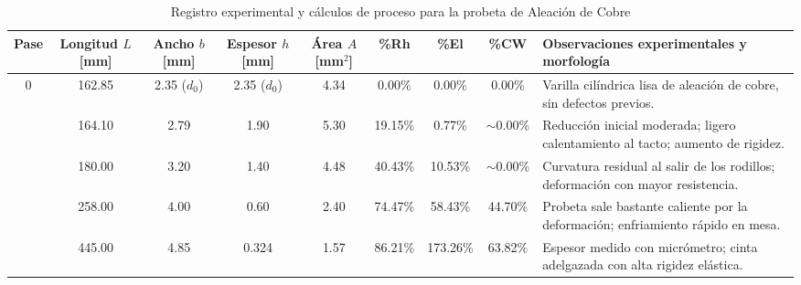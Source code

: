 \documentclass[journal]{IEEEtran}
\begin{document}
\begin{table}[t]
\centering
\caption{Registro experimental y cálculos de proceso para la probeta de Aleación de Cobre}
\label{tab:datos_cobre}
\footnotesize
\setlength{\tabcolsep}{3.5pt}
\renewcommand{\arraystretch}{1.15}
\begin{tabularx}{\textwidth}{c c c c c c c c >{\raggedright\arraybackslash}X}
\toprule
\textbf{Pase} & \makecell{\textbf{Longitud}\\\textbf{$L$ [mm]}} & \makecell{\textbf{Ancho}\\\textbf{$b$ [mm]}} & \makecell{\textbf{Espesor}\\\textbf{$h$ [mm]}} & \makecell{\textbf{Área}\\\textbf{$A$ [mm$^2$]}} & \textbf{\%Rh} & \textbf{\%El} & \textbf{\%CW} & \textbf{Observaciones experimentales y morfología} \\
\midrule
0 & 162.85 & 2.35 ($d_0$) & 2.35 ($d_0$) & 4.34 & 0.00\% & 0.00\% & 0.00\% & Varilla cilíndrica lisa de aleación de cobre, sin defectos previos. \\ \addlinespace[3.5pt]
1 & 164.10 & 2.79 & 1.90 & 5.30 & 19.15\% & 0.77\% & $\sim 0.00\%$ & Reducción inicial moderada; ligero calentamiento al tacto; aumento de rigidez. \\ \addlinespace[3.5pt]
2 & 180.00 & 3.20 & 1.40 & 4.48 & 40.43\% & 10.53\% & $\sim 0.00\%$ & Curvatura residual al salir de los rodillos; deformación con mayor resistencia. \\ \addlinespace[3.5pt]
3 & 258.00 & 4.00 & 0.60 & 2.40 & 74.47\% & 58.43\% & 44.70\% & Probeta sale bastante caliente por la deformación; enfriamiento rápido en mesa. \\ \addlinespace[3.5pt]
4 & 445.00 & 4.85 & 0.324 & 1.57 & 86.21\% & 173.26\% & 63.82\% & Espesor medido con micrómetro; cinta adelgazada con alta rigidez elástica. \\
\bottomrule
\end{tabularx}
\end{table}
\end{document}
